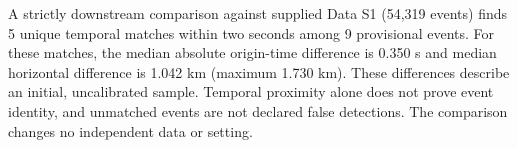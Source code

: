 A strictly downstream comparison against supplied Data S1 (54,319 events) finds 5 unique temporal matches within two seconds among 9 provisional events. For these matches, the median absolute origin-time difference is 0.350 s and median horizontal difference is 1.042 km (maximum 1.730 km). These differences describe an initial, uncalibrated sample. Temporal proximity alone does not prove event identity, and unmatched events are not declared false detections. The comparison changes no independent data or setting.
